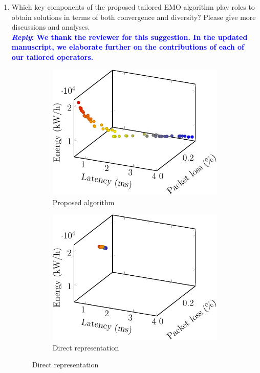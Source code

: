 \begin{enumerate}
      \item\textsf{Which key components of the proposed tailored EMO algorithm play roles to obtain solutions in terms of both convergence and diversity? Please give more discussions and analyses.}\\
            \textcolor{blue}{\textbf{\textit{Reply}: We thank the reviewer for this suggestion. In the updated manuscript, we elaborate further on the contributions of each of our tailored operators.}}
            \begin{figure}[t!]
                  \centering
                  \begin{subfigure}[b]{0.32\linewidth}
                        \includegraphics[width=\textwidth]{figs/comparison/qm-crop}
                        \caption{Proposed algorithm}
                  \end{subfigure}
                  \begin{subfigure}[b]{0.32\linewidth}
                        \includegraphics[width=\textwidth]{figs/comparison/std-crop}
                        \caption{Direct representation}
                  \end{subfigure}


\end{figure}
\end{enumerate}
